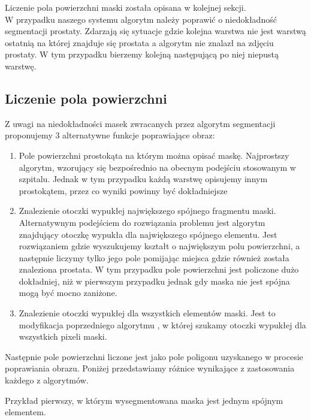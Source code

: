 \documentclass[a4paper,11pt,twoside]{report}
\theoremstyle{definition}
\begin{document}
Liczenie pola powierzchni maski została opisana w kolejnej sekcji. \\
W przypadku naszego systemu algorytm należy poprawić o niedokładność segmentacji prostaty. Zdarzają się sytuacje gdzie kolejna warstwa nie jest warstwą ostatnią na której znajduje się prostata a algorytm nie znalazł na zdjęciu prostaty. W tym przypadku bierzemy kolejną następującą po niej niepustą warstwę.

\subsection{Liczenie pola powierzchni}
Z uwagi na niedokładności masek zwracanych przez algorytm segmentacji proponujemy 3 alternatywne funkcje poprawiające obraz:
\begin{enumerate}
\item Pole powierzchni prostokąta na którym można opisać maskę. Najprostszy algorytm, wzorujący się bezpośrednio na obecnym podejściu stosowanym w szpitalu. Jednak w tym przypadku każdą warstwę opisujemy innym prostokątem, przez co wyniki powinny być dokładniejsze
\item Znalezienie otoczki wypukłej największego spójnego fragmentu maski. Alternatywnym podejściem do rozwiązania problemu jest algorytm znajdujący otoczkę wypukła dla największego spójnego elementu. Jest rozwiązaniem gdzie wyszukujemy kształt o największym polu powierzchni, a następnie liczymy tylko jego pole pomijając miejsca gdzie również została znaleziona prostata. W tym przypadku pole powierzchni jest policzone dużo dokładniej, niż w pierwszym przypadku jednak gdy maska nie jest spójna mogą być mocno zaniżone. 
\item Znalezienie otoczki wypukłej dla wszystkich elementów maski. Jest to modyfikacja poprzedniego algorytmu , w której szukamy otoczki wypukłej dla wszystkich pixeli maski.
\end{enumerate}

Następnie pole powierzchni liczone jest jako pole poligonu uzyskanego w procesie poprawiania obrazu. Poniżej przedstawiamy różnice wynikające z zastosowania każdego z algorytmów.

Przykład pierwszy, w którym wysegmentowana maska jest jednym spójnym elementem. \\ \\
\end{document}
